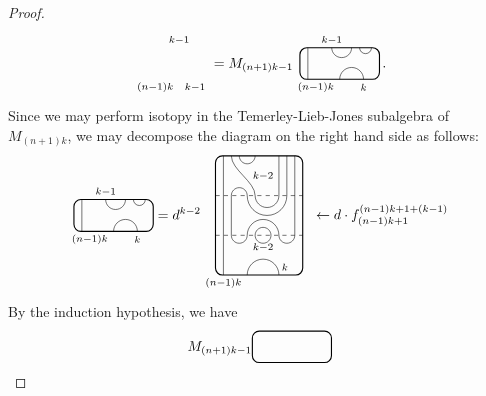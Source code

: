 \documentclass[11pt]{article}
\theoremstyle{plain}
\theoremstyle{definition}
\newcommand{\dave}[1]{\marginpar{\tiny \textcolor{orange}{DP: #1}}}
\begin{document}
\begin{proof}
\begin{align*}
\begin{tikzpicture}[baseline = .3cm]
	\node at (.6,1) {\scriptsize{$k{-}1$}};
	\node at (1,-.2) {\scriptsize{$k{-}1$}};
	\node at (0,-.2) {\scriptsize{$(n{-}1)k$}};
\end{tikzpicture}
=
M_{(n+1)k-1} 
\begin{tikzpicture}[baseline = .3cm]
	\draw[thick, rounded corners = 5pt] (0,0) rectangle (2,.8);
	\draw (.2,0) -- (.2,.8);
	\draw (.8,.8) arc (-180:0:.25cm);
	\draw (1.5,.8) arc (-180:0:.15cm);
	\draw (1,0) arc (180:0:.3cm);
	\node at (.8,1) {\scriptsize{$k{-}1$}};
	\node at (1.6,-.2) {\scriptsize{$k$}};
	\node at (.4,-.2) {\scriptsize{$(n{-}1)k$}};
\end{tikzpicture}
\,.
\end{align*}
Since we may perform isotopy in the Temerley-Lieb-Jones subalgebra of $M_{(n+1)k}$, we may decompose the diagram on the right hand side as follows:
$$
\begin{tikzpicture}[baseline = .3cm]
	\draw[thick, rounded corners = 5pt] (0,0) rectangle (2,.8);
	\draw (.2,0) -- (.2,.8);
	\draw (.8,.8) arc (-180:0:.25cm);
	\draw (1.5,.8) arc (-180:0:.15cm);
	\draw (1,0) arc (180:0:.3cm);
	\node at (.8,1) {\scriptsize{$k{-}1$}};
	\node at (1.6,-.2) {\scriptsize{$k$}};
	\node at (.4,-.2) {\scriptsize{$(n{-}1)k$}};
\end{tikzpicture}
=
d^{k-2}
\begin{tikzpicture}[baseline = 1.4cm]
	\draw[thick, rounded corners = 5pt] (0,0) rectangle (2.2,3);
	\draw (.2,0) -- (.2,3);
	\draw (.6,3) arc (-180:0:.2cm);
	\draw (.4,3) .. controls ++(270:.35cm) and ++(90:.35cm) .. (1,2) arc (-180:0:.3cm) -- (1.6,3);
	\draw (1.8,3) -- (1.8,2) arc (0:-180:.5cm) arc (0:180:.2cm) -- (.4,1) arc (-180:0:.2cm) arc (180:0:.4cm) arc (-180:0:.2cm) -- (2,3);
	\draw (1.2,1) circle (.2cm);
	\draw (.8,0) arc (180:0:.4cm);
	\draw[dashed] (0,1) -- (2.2,1);
	\draw[dashed] (0,2) -- (2.2,2);
	\node at (1.2,.7) {\scriptsize{$k{-}2$}};
	\node at (1.2,2.5) {\scriptsize{$k{-}2$}};
	\node at (1.75,.2) {\scriptsize{$k$}};
	\node at (.2,-.2) {\scriptsize{$(n{-}1)k$}};
%
	\node at (4.2,1.5) {$\leftarrow d\cdot f^{(n-1)k+1+(k-1)}_{(n-1)k+1}$};
\end{tikzpicture}
$$
By the induction hypothesis, we have
$$
M_{(n+1)k-1}
\begin{tikzpicture}[baseline = .3cm]
	\draw[thick, rounded corners = 5pt] (0,0) rectangle (2,.8);

\end{tikzpicture}$$
\end{proof}
\end{document}
